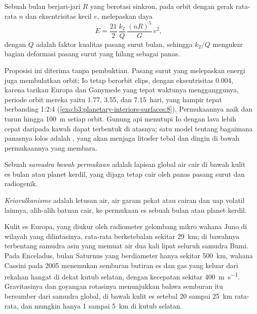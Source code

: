 \begin{proposition}\label{prop:b3:planetary-interiors-surfaces:tidal-power}
Sebuah bulan berjari-jari $R$ yang berotasi sinkron, pada orbit dengan gerak rata-rata
$n$ dan eksentrisitas kecil $e$, melepaskan daya
\[
  \dot E = \frac{21}{2}\,\frac{k_2}{Q}\,\frac{(nR)^5}{G}\,e^2 ,
\]
dengan $Q$ adalah faktor kualitas pasang surut bulan, sehingga $k_2/Q$ mengukur
bagian deformasi pasang surut yang hilang sebagai panas.
\end{proposition}

Proposisi ini diterima tanpa pembuktian. Pasang surut yang melepaskan energi juga membulatkan
orbit; Io tetap berorbit elips, dengan eksentrisitas 0.004, karena
tarikan Europa dan Ganymede yang tepat waktunya mengganggunya, periode orbit mereka
yaitu 1.77, 3.55, dan \num{7.15}~hari, yang hampir tepat berbanding
1:2:4 (\cref{exo:b3:planetary-interiors-surfaces:8}). Permukaannya naik
dan turun hingga \qty{100}{m} setiap orbit.
Gunung api menutupi Io dengan lava lebih cepat daripada kawah dapat terbentuk di atasnya; satu model
tentang bagaimana panasnya lolos adalah , yang akan menjaga
litosfer tebal dan dingin di bawah permukaannya yang membara.

\begin{definition}\label{def:b3:planetary-interiors-surfaces:ocean-world}
Sebuah \emph{samudra bawah permukaan} adalah lapisan global
air cair di bawah kulit es bulan atau planet kerdil, yang dijaga tetap cair oleh
panas pasang surut dan radiogenik.
\end{definition}

\begin{definition}[Kriovulkanisme]\label{def:b3:planetary-interiors-surfaces:cryovolcanism}
\emph{Kriovulkanisme} adalah letusan air, air garam pekat
atau cairan dan uap volatil lainnya, alih-alih batuan cair, ke
permukaan es sebuah bulan atau planet kerdil.
\end{definition}

Kulit es Europa, yang diukur oleh radiometer gelombang mikro wahana Juno
di wilayah yang dilintasinya, rata-rata berketebalan sekitar \qty{29}{km};
di bawahnya terbentang samudra asin yang memuat air dua kali lipat seluruh
samudra Bumi. Pada Enceladus, bulan Saturnus yang berdiameter hanya sekitar \qty{500}{km},
wahana Cassini pada 2005 menemukan semburan butiran es dan gas yang keluar dari
rekahan hangat di dekat kutub selatan, dengan kecepatan sekitar
\qty{400}{m.s^{-1}}. Gravitasinya dan goyangan rotasinya menunjukkan
bahwa semburan itu bersumber dari samudra global, di bawah kulit es setebal 20 sampai
\qty{25}{km} rata-rata, dan mungkin hanya 1 sampai \qty{5}{km} di
kutub selatan.

